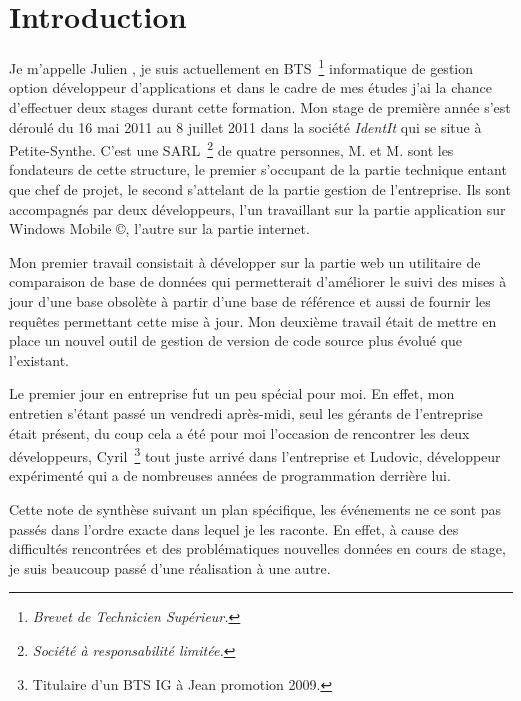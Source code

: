 \chapter{Introduction}

Je m'appelle Julien , je suis actuellement en BTS\,
\footnote{\emph{Brevet de Technicien Supérieur.}} informatique de gestion
option développeur d'applications et dans le cadre de mes études j'ai la chance
d'effectuer deux stages durant cette formation. Mon stage de première année s'est déroulé du 16 mai 2011 au 8 juillet 2011 dans la société \emph{IdentIt}
qui se situe à Petite-Synthe. C'est une SARL\, \footnote{\emph{Société à
responsabilité limitée.}} de quatre personnes, M. et
M. sont les fondateurs de cette structure, le premier s'occupant de
la partie technique entant que chef de projet, le second s'attelant de la
partie gestion de l'entreprise. Ils sont accompagnés par deux développeurs,
l'un travaillant sur la partie application sur Windows Mobile \copyright,
l'autre sur la partie internet.

Mon premier travail consistait à développer sur la partie web un utilitaire de
comparaison de base de données qui permetterait d'améliorer le suivi des mises
à jour d'une base obsolète à partir d'une base de référence et aussi de fournir
les requêtes permettant cette mise à jour. Mon deuxième travail était de mettre
en place un nouvel outil de gestion de version de code source plus évolué que
l'existant.

Le premier jour en entreprise fut un peu spécial pour moi. En effet, mon
entretien s'étant passé un vendredi après-midi, seul les gérants de
l'entreprise était présent, du coup cela a été pour moi l'occasion de
rencontrer les deux développeurs, Cyril\, \footnote{Titulaire d'un BTS IG à
Jean  promotion 2009.} tout juste arrivé dans l'entreprise et
Ludovic, développeur expérimenté qui a de nombreuses années de programmation
derrière lui.

Cette note de synthèse suivant un plan spécifique, les événements ne ce sont
pas passés dans l'ordre exacte dans lequel je les raconte. En effet, à cause
des difficultés rencontrées et des problématiques nouvelles données en cours de
stage, je suis beaucoup passé d'une réalisation à une autre.

\clearpage
